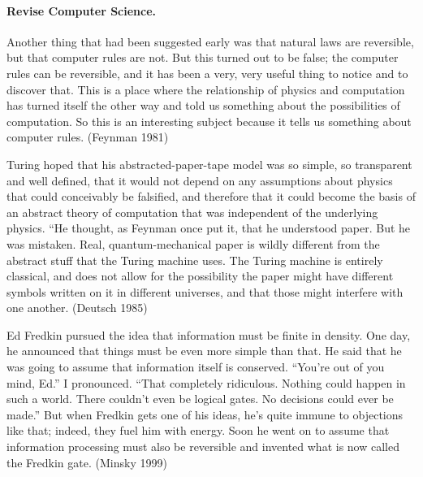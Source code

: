 \documentclass{article}
\newcommand{\jc}[1]{\fbox{Jacques says:} \textbf{#1}}
\begin{document}

\paragraph*{Revise Computer Science.}

Another thing that had been suggested early was that natural laws are
reversible, but that computer rules are not. But this turned out to be
false; the computer rules can be reversible, and it has been a very,
very useful thing to notice and to discover that. This is a place
where the relationship of physics and computation has turned itself
the other way and told us something about the possibilities of
computation. So this is an interesting subject because it tells us
something about computer rules.  (Feynman 1981)

Turing hoped that his abstracted-paper-tape model was so simple, so
transparent and well defined, that it would not depend on any
assumptions about physics that could conceivably be falsified, and
therefore that it could become the basis of an abstract theory of
computation that was independent of the underlying physics. ``He
thought, as Feynman once put it, that he understood paper. But he
was mistaken. Real, quantum-mechanical paper is wildly different from
the abstract stuff that the Turing machine uses. The Turing machine is
entirely classical, and does not allow for the possibility the paper
might have different symbols written on it in different universes, and
that those might interfere with one another.  (Deutsch 1985)

Ed Fredkin pursued the idea that information must be finite in
density. One day, he announced that things must be even more simple
than that. He said that he was going to assume that information itself
is conserved. ``You're out of you mind, Ed.'' I pronounced. ``That
completely ridiculous. Nothing could happen in such a world. There
couldn't even be logical gates. No decisions could ever be made.'' But
when Fredkin gets one of his ideas, he's quite immune to objections
like that; indeed, they fuel him with energy. Soon he went on to
assume that information processing must also be reversible and
invented what is now called the Fredkin gate. (Minsky 1999)
\end{document}
